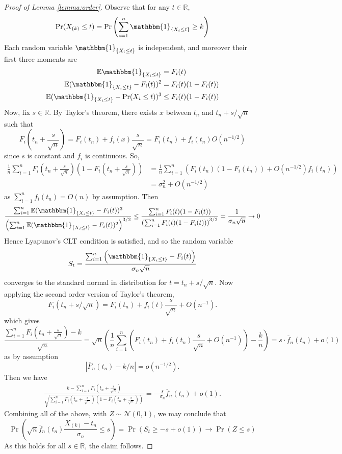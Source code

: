 \documentclass{article}
\theoremstyle{remark}
\newcommand{\R}{\mathbb{R}}
\newcommand{\E}{\mathbb{E}}
\newcommand{\1}{\mathbbm{1}}
\begin{document}
\begin{proof}[Proof of Lemma \ref{lemma:order}]
    Observe that for any $t \in \R$,
    \[\Pr(X_{(k)} \le t) = \Pr\left(\sum_{i=1}^n \1_{\{X_i \le t\}} \ge k\right)\]
    Each random variable $\1_{\{X_i \le t\}}$ is independent, and moreover their first three moments are
    \begin{align*}
        \E \1_{\{X_i \le t\}} &= F_i(t)\\
        \E (\1_{\{X_i \le t\}} - F_i(t))^2 &= F_i(t)(1-F_i(t))\\
        \E (\1_{\{X_i \le t\}} - \Pr(X_i \le t))^3 & \le F_i(t)(1-F_i(t))
    \end{align*}
    Now, fix $s \in \R$. 
    By Taylor's theorem, there exists $x$ between $t_n$ and $t_n + s / \sqrt{n}$ such that
    \[F_i\left(t_n + \frac{s}{\sqrt{n}}\right) = F_i(t_n) + f_i(x) \frac{s}{\sqrt{n}} = F_i(t_n) + f_i(t_n) O(n^{-1/2})\]
    since $s$ is constant and $f_i$ is continuous. So,
    \begin{align*}
        \frac{1}{n} \sum_{i=1}^n F_i(t_n + \frac{s}{\sqrt{n}})(1-F_i(t_n + \frac{s}{\sqrt{n}})) &= \frac{1}{n} \sum_{i=1}^n \left(F_i(t_n)(1-F_i(t_n)) + O(n^{-1/2}) f_i(t_n)\right)\\
        &= \sigma_n^2 + O(n^{-1/2})
    \end{align*}
    as $\sum_{i=1}^n f_i(t_n) = O(n)$ by assumption.
    Then
    \[\frac{\sum_{i=1}^n \E (\1_{\{X_i \le t\}} - F_i(t))^3}{\left(\sum_{i=1}^n \E (\1_{\{X_i \le t\}} - F_i(t))^2\right)^{3/2}} \le \frac{\sum_{i=1}^n F_i(t)(1-F_i(t))}{\left(\sum_{i=1}^n F_i(t)(1-F_i(t))\right)^{3/2}} = \frac{1}{\sigma_n \sqrt{n}} \to 0\]
    Hence Lyapunov's CLT condition is satisfied, and so the random variable
    \[S_t = \frac{\sum_{i=1}^n \left(\1_{\{X_i \le t\}} - F_i(t)\right)}{\sigma_n \sqrt{n}}\]
    converges to the standard normal in distribution for $t = t_n + s / \sqrt{n}$.
    Now applying the second order version of Taylor's theorem,
    \[F_i(t_n + s/\sqrt{n}) = F_i(t_n) + f_i(t) \frac{s}{\sqrt{n}} + O(n^{-1}).\]
    which gives
    \[\frac{\sum_{i=1}^n F_i(t_n + \frac{s}{\sqrt{n}}) - k}{\sqrt{n}} = \sqrt{n} \left(\frac{1}{n} \sum_{i=1}^n (F_i(t_n) + f_i(t_n) \frac{s}{\sqrt{n}} + O(n^{-1})) - \frac{k}{n}\right) = s \cdot \overline f_n(t_n) + o(1)\]
    as by assumption
    \[|\overline F_n(t_n) - k/n| = o(n^{-1/2}).\]
    Then we have
    \begin{align*}
        \frac{k - \sum_{i=1}^n F_i(t_n + \frac{s}{\sqrt{n}})}{\sqrt{\sum_{i=1}^n F_i(t_n + \frac{s}{\sqrt{n}})(1-F_i(t_n + \frac{s}{\sqrt{n}}))}} = -\frac{s}{\sigma_n} \overline f_n(t_n) + o(1).
    \end{align*}
    Combining all of the above, with $Z \sim \mathcal N(0, 1)$, we may conclude that
    \[\Pr\left(\sqrt{n} \bar f_n(t_n) \frac{X_{(k)} - t_n}{\sigma_n} \le s\right) = \Pr(S_t \ge -s + o(1)) \to \Pr(Z \le s)\]
    As this holds for all $s \in \R$, the claim follows.
\end{proof}
\end{document}
